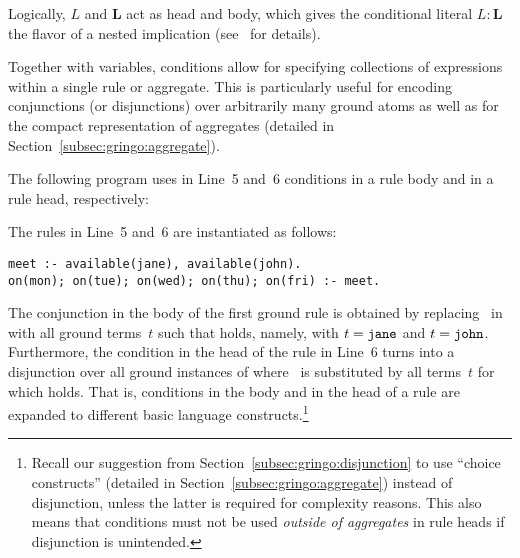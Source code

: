 \begin{note}
Logically, $L$ and $\boldsymbol{L}$ act as head and body,
which gives the conditional literal $L:\boldsymbol{L}$ the flavor of a nested implication
(see~\cite{haliya14a} for details).
\eexample{}
\end{note}

Together with variables,
conditions allow for specifying collections of expressions within a single rule or aggregate.
This is particularly useful for encoding conjunctions (or disjunctions) over
arbitrarily many ground atoms as well as for the compact representation of aggregates
(detailed in Section~\ref{subsec:gringo:aggregate}).

\begin{example}\label{ex:cond}
The following program uses in Line~5 and~6 conditions in a rule body and in a rule head, respectively:
%

%
The rules in Line~5 and~6 are instantiated as follows:%
\begin{lstlisting}[numbers=none]
meet :- available(jane), available(john).
on(mon); on(tue); on(wed); on(thu); on(fri) :- meet.
\end{lstlisting}
%
The conjunction in the body of the first ground rule is obtained by replacing~ in
 with all ground terms~$t$ such that
 holds, namely, with $t=\texttt{jane}$ and $t=\texttt{john}$.
Furthermore, the condition in the head of the rule in Line~6 turns into
a disjunction over all ground instances of
 where~ is substituted by all terms~$t$
for which  holds.
That is, conditions in the body and in the head of a rule
are expanded to different basic language constructs.\footnote{%
Recall our suggestion from Section~\ref{subsec:gringo:disjunction}
to use ``choice constructs'' (detailed in Section~\ref{subsec:gringo:aggregate})
instead of disjunction, unless the latter is required for complexity reasons.
This also means that conditions must 
not be used \emph{outside of aggregates} in rule heads
if disjunction is unintended.}
\eexample
\end{example}

